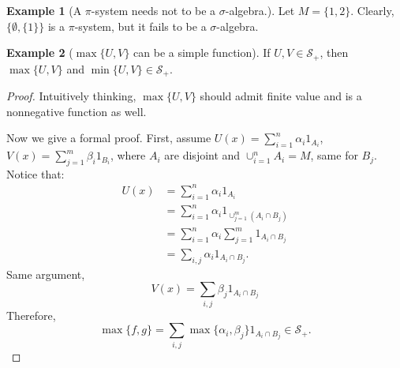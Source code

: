 \documentclass[12pt, a4paper]{article}
\theoremstyle{definition}
\newtheorem{example}{Example}
\newcommand{\summation}[2]{\sum\limits_{#1}^{#2}}
\newcommand{\union}[2]{\cup_{#1}^{#2}}
\newcommand{\m}[1]{\mathcal{#1}}
\begin{document}
\begin{example}[A $\pi$-system needs not to be a $\sigma$-algebra.]
Let $M=\{1,2\}$. Clearly, $\Big\{ \emptyset,\{1\}\Big\}$ is a $\pi$-system, but it fails to be a $\sigma$-algebra.
\end{example}

\begin{example}[$\max\{U,V\}$ can be a simple function]
If $U,V\in\m{S}_+$, then $\max\{U,V\}$ and $\min\{U,V\}\in\m{S}_+$.
\begin{proof}
Intuitively thinking, $\max\{U,V\}$ should admit finite value and is a nonnegative function as well. 

Now we give a formal proof. First, assume $U(x) = \summation{i=1}{n}\alpha_i1_{A_i}$, $V(x) = \summation{j=1}{m}\beta_i1_{B_i}$, where $A_i$  are disjoint and $\union{i=1}{n}A_i=M$, same for $B_j$. 
Notice that: 
\begin{align*}
U(x)&=\summation{i=1}{n}\alpha_i1_{A_i}\\
&=\summation{i=1}{n}\alpha_i1_{\union{j=1}{m}(A_i\cap B_j)}\\
&=\summation{i=1}{n}\alpha_i\summation{j=1}{m}1_{A_i\cap B_j}\\
&=\sum_{i,j}\alpha_i1_{A_i\cap B_j}.
\end{align*}
Same argument, 
\[
V(x) = \sum_{i,j}\beta_j1_{A_i\cap B_j}
\]
Therefore,
\[
\max\{f,g\}=\sum_{i,j}\max\{\alpha_i,\beta_j\}1_{A_i\cap B_j}\in\m{S}_+.
\]

\end{proof}
\end{example}
\end{document}
